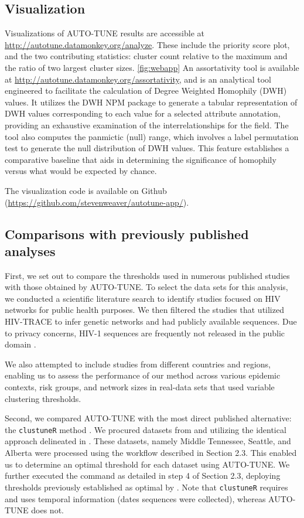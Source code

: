 \documentclass[utf8]{FrontiersinHarvard} %
\begin{document}
\subsection{Visualization}

Visualizations of AUTO-TUNE results are accessible at
\url{http://autotune.datamonkey.org/analyze}. These include the priority score
plot, and the two contributing statistics: cluster count relative to the
maximum and the ratio of two largest cluster sizes. \ref{fig:webapp} An
assortativity tool is available at
\url{http://autotune.datamonkey.org/assortativity}, and is an analytical tool
engineered to facilitate the calculation of Degree Weighted Homophily (DWH)
values. It utilizes the DWH NPM package to generate a tabular representation of
DWH values corresponding to each value for a selected attribute annotation,
providing an exhaustive examination of the interrelationships for the field.
The tool also computes the panmictic (null) range, which involves a label
permutation test to generate the null distribution of DWH values. This feature
establishes a comparative baseline that aids in determining the significance of
homophily versus what would be expected by chance.

The visualization code is available on Github
(\url{https://github.com/stevenweaver/autotune-app/}).

\subsection{Comparisons with previously published analyses}

First, we set out to compare the thresholds used in numerous published studies
with those obtained by AUTO-TUNE. To select the data sets for this analysis, we
conducted a scientific literature search to identify studies focused on HIV
networks for public health purposes. We then filtered the studies that utilized
HIV-TRACE to infer genetic networks and had publicly available sequences. Due
to privacy concerns, HIV-1 sequences are frequently not released in the public
domain \cite{Inzaule:2023aa}.

We also attempted to include studies from different countries and regions,
enabling us to assess the performance of our method across various epidemic
contexts, risk groups, and network sizes in real-data sets that used variable
clustering thresholds.

Second, we compared AUTO-TUNE with the most direct published alternative: the
	{\tt clustuneR} method \citep{chato_public_2020}. We procured datasets from
\citep{wolf_short_2017} and \citep{vrancken_multi-faceted_2017} utilizing the
identical approach delineated in \cite{chato_public_2020}. These datasets,
namely Middle Tennessee, Seattle, and Alberta were processed using the workflow
described in Section 2.3. This enabled us to determine an optimal threshold for
each dataset using AUTO-TUNE. We further executed the command as detailed in
step 4 of Section 2.3, deploying thresholds previously established as optimal
by \citep{chato_public_2020}. Note that {\tt clustuneR} requires and uses
temporal information (dates sequences were collected), whereas AUTO-TUNE does
not.
\end{document}
